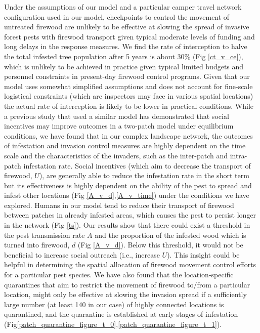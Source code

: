 Under the assumptions of our model and a particular camper travel network configuration used in our model, checkpoints to control the movement of untreated firewood are unlikely to be effective at slowing the spread of invasive forest pests with firewood transport given typical moderate levels of funding and long delays in the response measures. We find the rate of interception to halve the total infested tree population after 5 years is about 30\% (Fig \ref{ct_v_ce}), which is unlikely to be achieved in practice given typical limited budgets and personnel constraints in present-day firewood control programs. Given that our model uses somewhat simplified assumptions and does not account for fine-scale logistical constraints (which are inspectors may face in various spatial locations) the actual rate of interception is likely to be lower in practical conditions. While a previous study \cite{barlow2014modelling} that used a similar model has demonstrated that social incentives may improve outcomes in a two-patch model under equilibrium conditions, we have found that in our complex landscape network, the outcomes of infestation and invasion control measures are highly dependent on the time scale and the characteristics of the invaders, such as the inter-patch and intra-patch infestation rate. Social incentives (which aim to decrease the transport of firewood, $U$), are generally able to reduce the infestation rate in the short term but its effectiveness is highly dependent on the ability of the pest to spread and infest other locations (Fig \ref{A_v_d},\ref{A_v_time}) under the conditions we have explored. Humans in our model tend to reduce their transport of firewood between patches in already infested areas, which causes the pest to persist longer in the network (Fig \ref{ts}). Our results show that there could exist a threshold in the pest transmission rate $A$ and the proportion of the infested wood which is turned into firewood, $d$ (Fig \ref{A_v_d}). Below this threshold, it would not be beneficial to increase social outreach (i.e., increase $U$). This insight could be helpful in determining the spatial allocation of firewood movement control efforts for a particular pest species. We have also found that the location-specific quarantines that aim to restrict the movement of firewood to/from a particular location, might only be effective at slowing the invasion spread if a sufficiently large number (at least 140 in our case) of highly connected locations is quarantined, and the quarantine is established at early stages of infestation (Fig\ref{patch_quarantine_figure_t_0},\ref{patch_quarantine_figure_t_1}).

